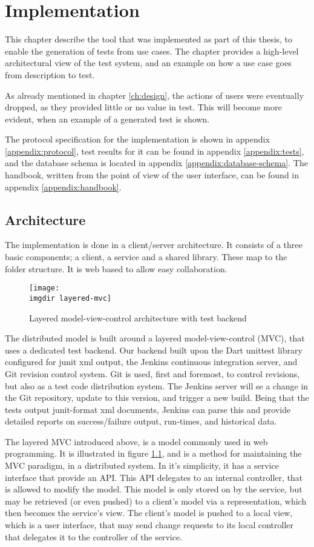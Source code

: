 \chapter{Implementation}
This chapter describe the tool that was implemented as part of this thesis, to enable the generation of tests from use cases. The chapter provides a high-level architectural view of the test system, and an example on how a use case goes from description to test.\medskip

\noindent As already mentioned in chapter \ref{ch:design}, the actions of users were eventually dropped, as they provided little or no value in test. This will become more evident, when an example of a generated test is shown.\medskip

\noindent The protocol specification for the implementation is shown in appendix \ref{appendix:protocol}, test results for it can be found in appendix \ref{appendix:tests}, and the database schema is located in appendix \ref{appendix:database-schema}. The handbook, written from the point of view of the user interface, can be found in appendix \ref{appendix:handbook}.

\section{Architecture}
The implementation is done in a client/server architecture. It consists of a three basic components; a client, a service and a shared library. These map to the folder structure. It is web based to allow easy collaboration.\medskip
\begin{figure}[!htbp]
  \centering
  \texttt{[image: \\imgdir layered-mvc]}
  \caption{Layered model-view-control architecture with test backend}
  \label{fig:layered-mvc}
\end{figure}
\noindent The distributed model is built around a layered model-view-control (MVC), that uses a dedicated test backend. Our backend built upon the Dart unittest library configured for junit xml output, the Jenkins continuous integration server, and Git revision control system. Git is used, first and foremost, to control revisions, but also as a test code distribution system. The Jenkins server will se a change in the Git repository, update to this version, and trigger a new build. Being that the tests output junit-format xml documents, Jenkins can parse this and provide detailed reports on success/failure output, run-times, and historical data.\medskip

\noindent The layered MVC introduced above, is a model commonly used in web programming. It is illustrated in figure \ref{fig:layered-mvc}, and is a method for maintaining the MVC paradigm, in a distributed system. In it's simplicity, it has a service interface that provide an API. This API delegates to an internal controller, that is allowed to modify the model. This model is only stored on by the service, but may be retrieved (or even pushed) to a client's model via a representation, which then becomes the service's view. The client's model is pushed to a local view, which is a user interface, that may send change requests to its local controller that delegates it to the controller of the service.\medskip

